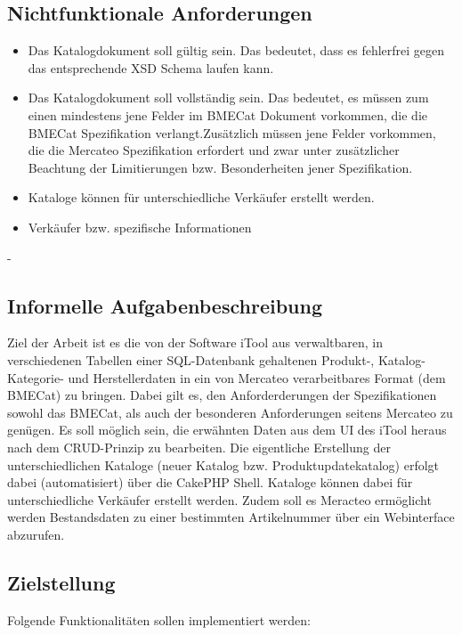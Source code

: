 	\subsection{Nichtfunktionale Anforderungen}
	\begin{itemize}
	\item Das Katalogdokument soll gültig sein. Das bedeutet, dass es fehlerfrei gegen das entsprechende XSD Schema laufen kann.
	\item Das Katalogdokument soll vollständig sein. Das bedeutet, es müssen zum einen mindestens jene Felder im BMECat Dokument vorkommen, die die BMECat Spezifikation verlangt.Zusätzlich müssen jene Felder vorkommen, die die Mercateo Spezifikation erfordert und zwar unter zusätzlicher Beachtung der Limitierungen bzw. Besonderheiten jener Spezifikation. 	
	\item Kataloge können für unterschiedliche Verkäufer erstellt werden.
	\item Verkäufer bzw. spezifische Informationen 
	\end{itemize}
			- 
	
	\subsection{Informelle Aufgabenbeschreibung}
	Ziel der Arbeit ist es die von der Software iTool aus verwaltbaren, in verschiedenen Tabellen einer SQL-Datenbank gehaltenen Produkt-, Katalog- Kategorie- und Herstellerdaten in ein von Mercateo verarbeitbares Format (dem BMECat) zu bringen. Dabei gilt es, den Anforderderungen der Spezifikationen sowohl das BMECat, als auch der besonderen Anforderungen seitens Mercateo zu genügen.
	Es soll möglich sein, die erwähnten Daten aus dem UI des iTool heraus nach dem CRUD-Prinzip zu bearbeiten. 
	Die eigentliche Erstellung der unterschiedlichen Kataloge (neuer Katalog bzw. Produktupdatekatalog) erfolgt dabei (automatisiert) über die CakePHP Shell. Kataloge können dabei für unterschiedliche Verkäufer erstellt werden.
	Zudem soll es Meracteo ermöglicht werden Bestandsdaten zu einer bestimmten Artikelnummer über ein Webinterface abzurufen.
	
	\subsection{Zielstellung}
	
	Folgende Funktionalitäten sollen implementiert werden:
	

